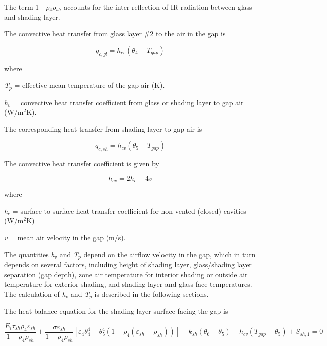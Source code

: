 The term 1 - \emph{$\rho$\(_{4}\)$\rho$\(_{sh}\)} accounts for the inter-reflection of IR radiation between glass and shading layer.

The convective heat transfer from glass layer \#2 to the air in the gap is

\begin{equation}
{q_{c,gl}} = {h_{cv}}({\theta_4} - {T_{gap}})
\end{equation}

where

\emph{T\(_{p}\)} = effective mean temperature of the gap air (K).

\emph{h\(_{v}\)} = convective heat transfer coefficient from glass or shading layer to gap air (W/m\(^{2}\)K).

The corresponding heat transfer from shading layer to gap air is

\begin{equation}
{q_{c,sh}} = {h_{cv}}({\theta_5} - {T_{gap}})
\end{equation}

The convective heat transfer coefficient is given by

\begin{equation}
{h_{cv}} = 2{h_c} + 4v
\end{equation}

where

\emph{h\(_{c}\)} = surface-to-surface heat transfer coefficient for non-vented (closed) cavities (W/m\(^{2}\)K)

\emph{v} = mean air velocity in the gap (m/s).

The quantities \emph{h\(_{v}\)} and \emph{T\(_{p}\)} depend on the airflow velocity in the gap, which in turn depends on several factors, including height of shading layer, glass/shading layer separation (gap depth), zone air temperature for interior shading or outside air temperature for exterior shading, and shading layer and glass face temperatures. The calculation of \emph{h\(_{v}\)} and \emph{T\(_{p}\)} is described in the following sections.

The heat balance equation for the shading layer surface facing the gap is

\begin{equation}
\frac{E_i \tau_{sh} \rho_4 \varepsilon_{sh}} {1 - \rho_4 \rho_{sh}} + 
  \frac{\sigma \varepsilon_{sh}} {1 - \rho_4 \rho_{sh}} \left[
    \varepsilon_4 \theta_4^4 - \theta_5^4 (
      1 - \rho_4( 
        \varepsilon_{sh} + \rho_{sh}
      )
    )
  \right] + 
  k_{sh} \left(
    \theta_6 - \theta_5
  \right) + 
  h_{cv} \left(
    T_{gap} - \theta_5
  \right) + 
  S_{sh,1} = 0
\end{equation}

